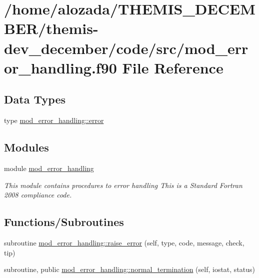 \hypertarget{mod__error__handling_8f90}{}\section{/home/alozada/\+T\+H\+E\+M\+I\+S\+\_\+\+D\+E\+C\+E\+M\+B\+E\+R/themis-\/dev\+\_\+december/code/src/mod\+\_\+error\+\_\+handling.f90 File Reference}
\label{mod__error__handling_8f90}
\subsection*{Data Types}
\begin{DoxyCompactItemize}
\item 
type \hyperlink{structmod__error__handling_1_1error}{mod\+\_\+error\+\_\+handling\+::error}
\end{DoxyCompactItemize}
\subsection*{Modules}
\begin{DoxyCompactItemize}
\item 
module \hyperlink{namespacemod__error__handling}{mod\+\_\+error\+\_\+handling}
\begin{DoxyCompactList}\small\item\em This module contains procedures to error handling This is a Standard Fortran 2008 compliance code. \end{DoxyCompactList}\end{DoxyCompactItemize}
\subsection*{Functions/\+Subroutines}
\begin{DoxyCompactItemize}
\item 
subroutine \hyperlink{namespacemod__error__handling_a93bd5f43a4db84dd187231ce58493d0a}{mod\+\_\+error\+\_\+handling\+::raise\+\_\+error} (self, type, code, message, check, tip)
\item 
subroutine, public \hyperlink{namespacemod__error__handling_a54366620ef058729af93f4bc7d507df7}{mod\+\_\+error\+\_\+handling\+::normal\+\_\+termination} (self, iostat, status)
\end{DoxyCompactItemize}
